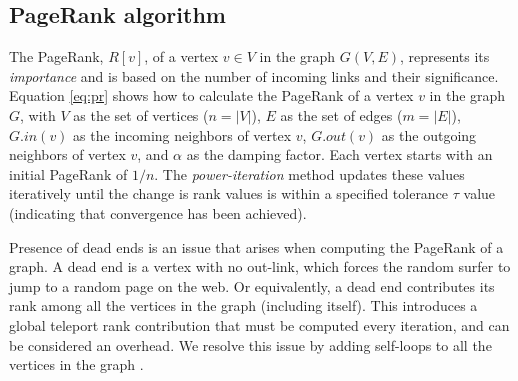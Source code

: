 \subsection{PageRank algorithm}
\label{sec:pagerank}

The PageRank, $R[v]$, of a vertex $v \in V$ in the graph $G(V, E)$, represents its \textit{importance} and is based on the number of incoming links and their significance. Equation \ref{eq:pr} shows how to calculate the PageRank of a vertex $v$ in the graph $G$, with $V$ as the set of vertices ($n = |V|$), $E$ as the set of edges ($m = |E|$), $G.in(v)$ as the incoming neighbors of vertex $v$, $G.out(v)$ as the outgoing neighbors of vertex $v$, and $\alpha$ as the damping factor. Each vertex starts with an initial PageRank of $1/n$. The \textit{power-iteration} method updates these values iteratively until the change is rank values is within a specified tolerance $\tau$ value (indicating that convergence has been achieved).


Presence of dead ends is an issue that arises when computing the PageRank of a graph. A dead end is a vertex with no out-link, which forces the random surfer to jump to a random page on the web. Or equivalently, a dead end contributes its rank among all the vertices in the graph (including itself). This introduces a global teleport rank contribution that must be computed every iteration, and can be considered an overhead. We resolve this issue by adding self-loops to all the vertices in the graph \cite{rank-andersen07, rank-langville06}.

